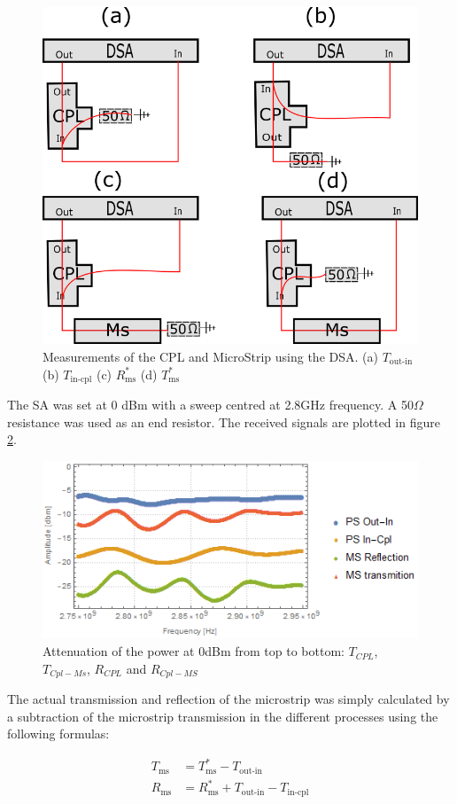 \begin{figure}[hb]
	\centering
	\includegraphics[width=0.7\linewidth]{../figures/APD}
	\caption[Measurements of the CPL and MicroStrip using the DSA]{Measurements of the CPL and MicroStrip using the DSA. (a) $T_\text{out-in}$ (b) $T_\text{in-cpl}$ (c) $R_\text{ms}^*$ (d) $T_\text{ms}^*$}
	\label{fig:apd}
\end{figure}

The SA was set at 0 dBm with a sweep centred at 2.8GHz frequency. A 50$\Omega$ resistance was used as an end resistor. The received signals are plotted in figure \ref{fig:microstrip}.\\

\begin{figure}
	\centering
	\includegraphics[width=0.7\linewidth]{../figures/microstrip}
	\caption[Microstrip Power Attenuation]{Attenuation of the power at 0dBm from top to bottom: $T_{CPL}$,$T_{Cpl-Ms}$, $R_{CPL}$ and $R_{Cpl-MS}$}
	\label{fig:microstrip}
	\end{figure}

The actual transmission and reflection of the microstrip was simply calculated by a subtraction of the microstrip transmission in the different processes using the following formulas:

\begin{align}
T_\text{ms}&=T_\text{ms}^*-T_\text{out-in}\\
R_\text{ms}&=R_\text{ms}^*+T_\text{out-in}-T_\text{in-cpl}
\end{align}


